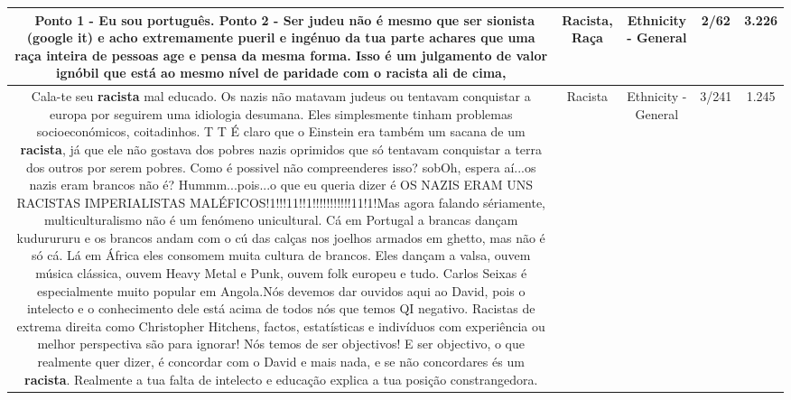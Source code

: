 \documentclass[11pt]{article}
\newlength\mylength
\begin{document}
\begin{center}
\begin{longtable}{|C{.65\mylength}|C{.30\mylength}|C{.12\mylength}|C{.12\mylength}|C{.12\mylength}|}
  \small {} Ponto 1 - Eu sou português. Ponto 2 - Ser judeu não é mesmo que ser sionista (google it) e acho extremamente pueril e ingénuo da tua parte achares que uma \textbf{raça} inteira de pessoas age e pensa da mesma forma. Isso é um julgamento de valor ignóbil que está ao mesmo nível de paridade com o \textbf{racista} ali de cima,\normalsize   & Racista, Raça & Ethnicity - General & 2/62 & 3.226 \\  \hline
  \small {} Cala-te seu \textbf{racista} mal educado. Os nazis não matavam judeus ou tentavam conquistar a europa por seguirem uma idiologia desumana. Eles simplesmente tinham problemas socioeconómicos, coitadinhos. T T É claro que o Einstein era também um sacana de um \textbf{racista}, já que ele não gostava dos pobres nazis oprimidos que só tentavam conquistar a terra dos outros por serem pobres. Como é possivel não compreenderes isso? sobOh, espera aí...os nazis eram brancos não é? Hummm...pois...o que eu queria dizer é OS NAZIS ERAM UNS RACISTAS IMPERIALISTAS MALÉFICOS!1!!!11!!1!!!!!!!!!!!11!1!Mas agora falando sériamente, multiculturalismo não é um fenómeno unicultural. Cá em Portugal a brancas dançam kudurururu e os brancos andam com o cú das calças nos joelhos armados em ghetto, mas não é só cá. Lá em África eles consomem muita cultura de brancos. Eles dançam a valsa, ouvem música clássica, ouvem Heavy Metal e Punk, ouvem folk europeu e tudo. Carlos Seixas é especialmente muito popular em Angola.Nós devemos dar ouvidos aqui ao David, pois o intelecto e o conhecimento dele está acima de todos nós que temos QI negativo. Racistas de extrema direita como Christopher Hitchens, factos, estatísticas e indivíduos com experiência ou melhor perspectiva são para ignorar! Nós temos de ser objectivos! E ser objectivo, o que realmente quer dizer, é concordar com o David e mais nada, e se não concordares és um \textbf{racista}. Realmente a tua falta de intelecto e educação explica a tua posição constrangedora.\normalsize   & Racista & Ethnicity - General & 3/241 & 1.245 \\  \hline

\end{longtable}
\end{center}
\end{document}
